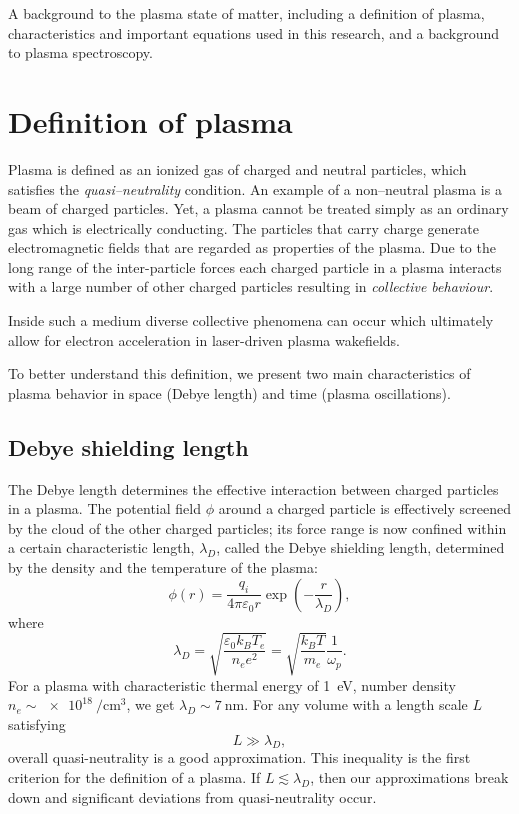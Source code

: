 \documentclass[../main.tex]{subfiles}
\begin{document}
A background to the plasma state of matter, including a definition of plasma, characteristics and important equations used in this research, and a background to plasma spectroscopy.
\section{Definition of plasma}
Plasma is defined \cite{Chen1984IntroductionFusion} as an ionized gas of charged and neutral particles, which satisfies the \emph{quasi--neutrality} condition. An example of a non--neutral plasma is a beam of charged particles. Yet, a plasma cannot be treated simply as an ordinary gas which is electrically conducting. The particles that carry charge generate electromagnetic fields that are regarded as properties of the plasma. Due to the long range of the inter-particle forces each charged particle in a plasma interacts with a large number of other charged particles resulting in \emph{collective behaviour}.

Inside such a medium diverse collective phenomena can occur which ultimately allow for electron acceleration in laser-driven plasma wakefields.

To better understand this definition, we present two main characteristics of plasma behavior in space (Debye length) and time (plasma oscillations).

\subsection{Debye shielding length}\label{sec:debye}
The Debye length determines the effective interaction between charged particles in a plasma. The potential field $\phi$ around a charged particle is effectively screened by the cloud of the other charged particles; its force range is now confined within a certain characteristic length, $\lambda_D$, called the Debye shielding length, determined by the density and the temperature of the plasma:
\begin{equation}
\phi(r)=\frac{q_i}{4\pi\varepsilon_0 r}\exp{\left(-\frac{r}{\lambda_D}\right)},
\end{equation}
where
\begin{equation}
\lambda_D=\sqrt{\frac{\varepsilon_0 k_B T_e}{n_e e^2}}=\sqrt{\frac{k_B T}{m_e}}\frac{1}{\omega_p}.
\end{equation}
For a plasma with characteristic thermal energy of \SI{1}{\electronvolt}, number density $n_e \sim \SI{e18}{\per\cubic\cm}$, we get $\lambda_D \sim \SI{7}{\nm}$.
For any volume with a length scale $L$ satisfying 
\begin{equation}
L \gg \lambda_D,
\label{eq:quasiNeutrality}
\end{equation}
overall quasi-neutrality is a good approximation. This inequality is the first criterion for the definition of a plasma. If $L\lesssim \lambda_D$, then our approximations break down and significant deviations from quasi-neutrality occur.
\end{document}
